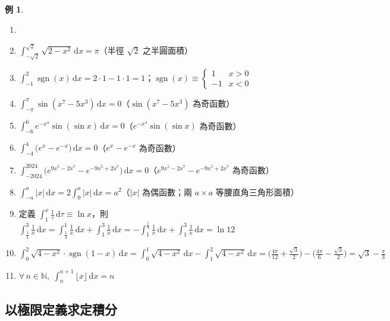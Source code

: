 \documentclass[12pt]{extarticle}
\newcommand{\ds}{\displaystyle}
\DeclareMathOperator*{\sgn}{sgn}
\newcommand{\floor}[1]{\lfloor #1 \rfloor}
\theoremstyle{definition}
\newtheorem*{ex}{例}
\newcommand{\myline}{\noindent\makebox[\linewidth]{\rule{\paperwidth}{0.4pt}}}
\begin{document}
\begin{ex}
  \begin{enumerate}\setlength{\itemsep}{0pt}
    \item[]
    \item $\ds\int_{-\sqrt{2}}^{\sqrt{2}} \sqrt{2 - x^2}\,\mathrm{d}x = \pi$（半徑 $\sqrt{2}$ 之半圓面積）
    \item $\ds\int_{-1}^2 \sgn(x)\,\mathrm{d}x = 2\cdot 1 - 1\cdot 1 = 1$；$\ds\sgn(x)\equiv\begin{cases} 1 & x > 0 \\ -1 & x < 0\end{cases}$ 
    \item $\ds\int_{-\pi}^{\pi} \sin(x^7-5x^3)\,\mathrm{d}x = 0$（$\sin(x^7-5x^3)$ 為奇函數）
    \item $\ds\int_{-6}^{6} e^{-x^4}\sin(\sin x)\,\mathrm{d}x = 0$（$e^{-x^4}\sin(\sin x)$ 為奇函數）
    \item $\ds\int_{-4}^{4} \big(e^{x} - e^{-x}\big)\,\mathrm{d}x = 0$（$e^{x} - e^{-x}$ 為奇函數）
    \item $\ds\int_{-2024}^{2024} \big(e^{9x^5-2x^7} - e^{-9x^5 + 2x^7}\big)\,\mathrm{d}x = 0$（$e^{9x^5-2x^7} - e^{-9x^5 + 2x^7}$ 為奇函數） 
    \item $\ds\int_{-a}^a |x|\,\mathrm{d}x = 2\int_0^a |x|\,\mathrm{d}x = a^2$（$|x|$ 為偶函數；兩 $a\times a$ 等腰直角三角形面積）
    \item 定義 $\ds\int_1^x\frac{1}{\tau}\,\mathrm{d}\tau\equiv\ln x$，則 $\ds\int_{\frac{1}{4}}^3\frac{1}{x}\,\mathrm{d}x = \int_{\frac{1}{4}}^1 \frac{1}{x}\,\mathrm{d}x + \int_1^3 \frac{1}{x}\,\mathrm{d}x = -\int_1^{\frac{1}{4}}\frac{1}{x}\,\mathrm{d}x + \int_1^3\frac{1}{x}\,\mathrm{d}x = \ln 12$
    \item $\ds\int_0^2 \sqrt{4 - x^2}\cdot\sgn(1 - x)\,\mathrm{d}x = \int_0^1\sqrt{4 - x^2}\,\text{d}x - \int_1^2\sqrt{4 - x^2}\,\text{d}x = \Big(\frac{4\pi}{12} + \frac{\sqrt{3}}{2}\Big) - \Big(\frac{4\pi}{6} - \frac{\sqrt{3}}{2}\Big) = \sqrt{3} - \frac{\pi}{3}$ 
    \item $\ds\forall\,n\in\mathbb{N},\;\int_n^{n+1}\floor{x}\,\mathrm{d}x = n$ 
  \end{enumerate}
\end{ex}

\myline

\subsection*{以極限定義求定積分}
\end{document}
